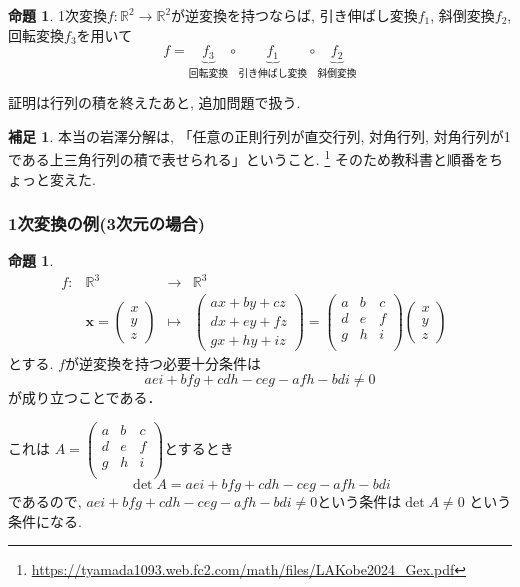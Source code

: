 \documentclass[dvipdfmx,a4paper,11pt]{article} %
\newcommand{\R}{\mathbb{R}}
\theoremstyle{definition}
\newtheorem{prop}[thm]{命題}
\newtheorem{rem}[thm]{補足}
\begin{document}
\begin{prop}\cite[命題 1.2.4 (岩澤分解)]{O}
1次変換$f : \R^2 \to \R^2$が逆変換を持つならば, 
引き伸ばし変換$f_1$, 斜倒変換$f_2$, 回転変換$f_3$を用いて
$$
f=\underbrace{f_{3}}_{\text{回転変換}} \circ \underbrace{f_1}_{\text{引き伸ばし変換}} \circ \underbrace{f_2}_{\text{斜倒変換}}
$$
\end{prop}
証明は行列の積を終えたあと, 追加問題で扱う. 
\begin{rem}
本当の岩澤分解は, 「任意の正則行列が直交行列, 対角行列, 対角行列が1である上三角行列の積で表せられる」ということ. 
\footnote{\url{https://tyamada1093.web.fc2.com/math/files/LAKobe2024_Gex.pdf}}
そのため教科書と順番をちょっと変えた. 
\end{rem}

\subsubsection{1次変換の例(3次元の場合)}
    
   \begin{prop}\cite[命題1.2.5]{O}
   $$
\begin{array}{ccccc}
f: &\R^3& \rightarrow & \R^3& \\
&
\bm{x}
=
\begin{pmatrix}
x \\ y \\z
 \end{pmatrix} & \longmapsto & 
 \begin{pmatrix}
a x + by + cz \\ dx+ey+fz \\ gx + hy+iz 
 \end{pmatrix}
 =
   \begin{pmatrix}
 a& b &c \\
  d& e &f \\
  g& h &i \\
 \end{pmatrix} 
 \begin{pmatrix}
x \\ y \\z
 \end{pmatrix} 
 &
\end{array}
$$
とする. 
$f$が逆変換を持つ必要十分条件は
\[
 aei+bfg+cdh-ceg-afh-bdi \neq 0 \] 
 が成り立つことである．
 \end{prop}
   
これは
$A=
  \begin{pmatrix}
 a& b &c \\
  d& e &f \\
  g& h &i \\
 \end{pmatrix} 
$とするとき 
$$
\det A = aei+bfg+cdh-ceg-afh-bdi 
$$
であるので, 
$ aei+bfg+cdh-ceg-afh-bdi \neq 0 $という条件は$\det A \neq 0$
という条件になる. 
\end{document}
